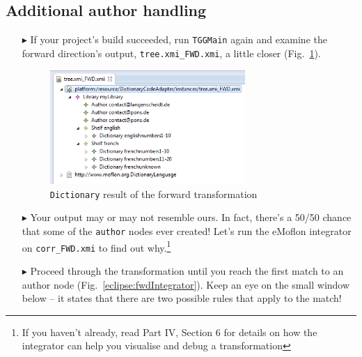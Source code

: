 \newpage
\hypertarget{t2m close}{}
\subsection{Additional author handling}
\genHeader

\begin{itemize}

\item[$\blacktriangleright$] If your project's build succeeded, run \texttt{TGGMain} again and examine the forward direction's output, 
\texttt{tree.xmi\_FWD.xmi}, a little closer (Fig.~\ref{eclipse:generatedFwdTrsfm}).

\vspace{0.5cm}

\begin{figure}[htbp]
\begin{center}
  \includegraphics[width=0.7\textwidth]{eclipse_generatedForwardTransformation}
  \caption{\texttt{Dictionary} result of the forward transformation}
  \label{eclipse:generatedFwdTrsfm}
\end{center}
\end{figure}

\vspace{0.5cm}

\item[$\blacktriangleright$] Your output may or may not resemble ours. In fact, there's a 50/50 chance that some of the \texttt{author} nodes ever created!
Let's run the eMoflon integrator on \texttt{corr\_FWD.xmi} to find out why.\footnote{If you haven't already, read Part IV, Section 6 for details on how the
integrator can help you visualise and debug a transformation}

\vspace{0.5cm}

\item[$\blacktriangleright$] Proceed through the transformation until you reach the first match to an author node (Fig.~\ref{eclipse:fwdIntegrator}). Keep an
eye on the small window below -- it states that there are two possible rules that apply to the match!


\end{itemize}
